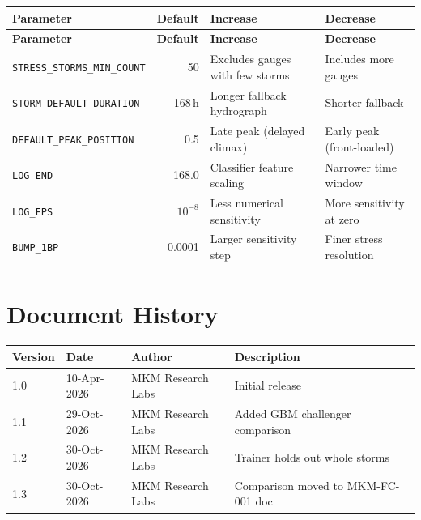 \documentclass[11pt,a4paper]{article}
\begin{document}
\begin{longtable}{p{4.8cm}rp{3.2cm}p{3.2cm}}
\toprule
\textbf{Parameter} & \textbf{Default} & \textbf{Increase} & \textbf{Decrease} \\
\midrule
\endfirsthead
\toprule
\textbf{Parameter} & \textbf{Default} & \textbf{Increase} & \textbf{Decrease} \\
\midrule
\endhead
\texttt{STRESS\_STORMS\_MIN\_COUNT} & 50 &
  Excludes gauges with few storms &
  Includes more gauges \\[4pt]
\texttt{STORM\_DEFAULT\_DURATION} & 168\,h &
  Longer fallback hydrograph &
  Shorter fallback \\[4pt]
\texttt{DEFAULT\_PEAK\_POSITION} & 0.5 &
  Late peak (delayed climax) &
  Early peak (front-loaded) \\[4pt]
\texttt{LOG\_END} & 168.0 &
  Classifier feature scaling &
  Narrower time window \\[4pt]
\texttt{LOG\_EPS} & $10^{-8}$ &
  Less numerical sensitivity &
  More sensitivity at zero \\[4pt]
\texttt{BUMP\_1BP} & 0.0001 &
  Larger sensitivity step &
  Finer stress resolution \\
\bottomrule
\end{longtable}


\section*{Document History}

\begin{tabular}{llll}
\toprule
\textbf{Version} & \textbf{Date} & \textbf{Author} & \textbf{Description} \\
\midrule
1.0 & 10-Apr-2026 & MKM Research Labs & Initial release \\
1.1 & 29-Oct-2026 & MKM Research Labs & Added GBM challenger comparison \\
1.2 & 30-Oct-2026 & MKM Research Labs & Trainer holds out whole storms \\
1.3 & 30-Oct-2026 & MKM Research Labs & Comparison moved to MKM-FC-001 doc \\
\bottomrule
\end{tabular}
\end{document}
